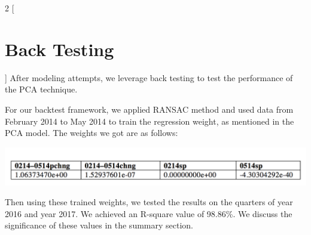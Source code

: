 \documentclass{article}
\begin{document}
\begin{multicols}{2}
[\section*{Back Testing}]
After modeling attempts, we leverage back testing to test the performance of the PCA technique. 

For our backtest framework, we applied RANSAC method and used data from February 2014 to May 2014 to train the regression weight, as mentioned in the PCA model. The weights we got are as follows:
\begin{center}
\includegraphics[scale = 0.35]{weight.png}
\end{center}

Then using these trained weights, we tested the results on the quarters of year 2016 and year 2017. We achieved an R-square value of 98.86\%. We discuss the significance of these values in the summary section.


\end{multicols}
\end{document}
